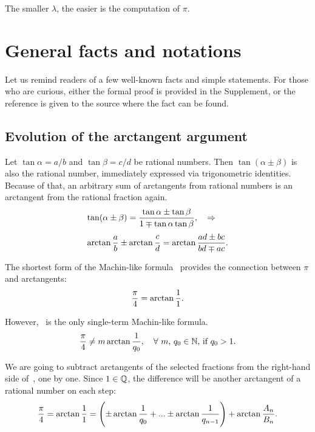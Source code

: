 \documentclass[draft, 10pt]{article} %
\newcounter{factno}
\def\thefactpun#1#2{\refstepcounter{factno}{\bf Fact~\thefactno\label{#1}#2\/}}
\begin{document}
The smaller $\lambda$, the easier is the computation
of $\pi$.~\cite{abrar, source-pi, lehmer-cite}

\section{General facts and notations}

Let us remind readers of a few well-known facts and simple statements. For those who are
curious, either the formal proof is provided in the Supplement, or the reference is given
to the source where the fact can be found.

\subsection{Evolution of the arctangent argument}

Let $\tan\alpha =a/b$ and $\tan\beta = c/d$ be rational numbers.
Then $\tan(\alpha \pm \beta)$ is also the rational number,
immediately expressed via trigonometric identities.
Because of that, an arbitrary sum of arctangents from rational numbers is an arctangent from
the rational fraction again.~\cite{handbook}
%
\begin{equation}\mlabel{arctan-sum}
\begin{array}{l}
\tan(\alpha \pm \beta) = \dfrac{\tan\alpha \pm \tan\beta}{1 \mp \tan\alpha \tan\beta \strut},
    \quad\ergo \\[1em]
\arctan\dfrac{a}{b} \pm \arctan\dfrac{c \strut}{d} = \arctan\dfrac{ad \pm bc}{bd \mp ac}.
\end{array}
\end{equation}

The shortest form of the Machin-like formula~ provides the connection between
$\pi$ and arctangents:
%
\begin{equation}\mlabel{unity}
\frac{\pi}{4} = \arctan\frac{1}{1}.
\end{equation}

However,~ is the only single-term Machin-like formula.
\thefactpun{nosingle}:
$$
\frac{\pi}{4} \ne m \arctan \displaystyle\frac{1}{q_0}, \quad \hbox{$\forall$ $m$, $q_0 \in \mathbb{N}$, if $q_0>1$.}
$$

We are going to subtract arctangents of the selected fractions from the right-hand
side of~, one by one.
Since $1 \in \mathbb{Q}$, the difference will be another arctangent of a rational number
on each step:
%
\begin{equation}\mlabel{remainder}
\dfrac{\pi}{4} = \arctan\dfrac{1}{1} =
    \left( \pm \arctan\dfrac{1}{q_0 \strut} + ... \pm \arctan\dfrac{1}{q_{n-1}} \right)
    + \arctan\dfrac{A_n}{B_n}.
\end{equation}
\end{document}
